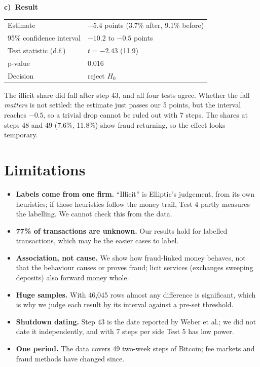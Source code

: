 \documentclass[10pt,a4paper,twocolumn]{article}
\newcommand{\tpart}[2]{\par\Needspace{7\baselineskip}\smallskip\textbf{#1)~#2}\par}
\begin{document}
\tpart{c}{Result}
{\small
\begin{tabularx}{\linewidth}{@{}K{3.4cm} Y@{}}
\toprule
Estimate & $-5.4$ points (3.7\% after, 9.1\% before) \\
95\% confidence interval & $-10.2$ to $-0.5$ points \\
Test statistic (d.f.) & $t=-2.43$ (11.9) \\
p-value & 0.016 \\
Decision & reject $H_0$ \\
\bottomrule
\end{tabularx}}

The illicit share did fall after step 43, and all four tests agree. Whether the fall
\emph{matters} is not settled: the estimate just passes our 5 points, but the interval
reaches $-0.5$, so a trivial drop cannot be ruled out with 7 steps. The shares at steps 48
and 49 (7.6\%, 11.8\%) show fraud returning, so the effect looks temporary.

\section{Limitations}

\begin{itemize}
  \item \textbf{Labels come from one firm.} ``Illicit'' is Elliptic's judgement, from its own
  heuristics; if those heuristics follow the money trail, Test 4 partly measures the
  labelling. We cannot check this from the data.
  \item \textbf{77\% of transactions are unknown.} Our results hold for labelled transactions,
  which may be the easier cases to label.
  \item \textbf{Association, not cause.} We show how fraud-linked money behaves, not that the
  behaviour causes or proves fraud; licit services (exchanges sweeping deposits) also
  forward money whole.
  \item \textbf{Huge samples.} With 46{,}045 rows almost any difference is significant, which
  is why we judge each result by its interval against a pre-set threshold.
  \item \textbf{Shutdown dating.} Step 43 is the date reported by Weber et al.; we did not
  date it independently, and with 7 steps per side Test 5 has low power.
  \item \textbf{One period.} The data covers 49 two-week steps of Bitcoin; fee markets and
  fraud methods have changed since.
\end{itemize}
\end{document}
